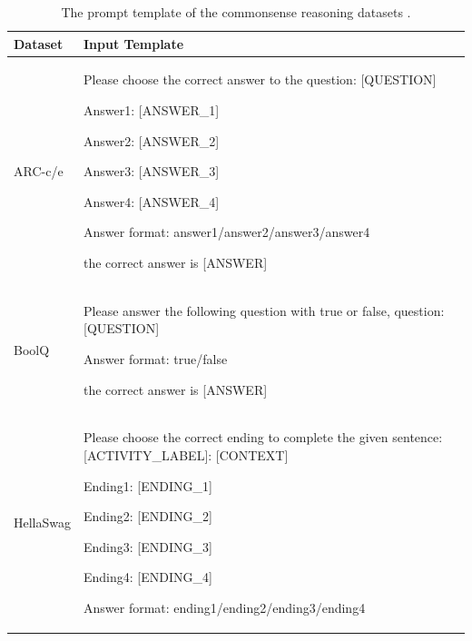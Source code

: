 \documentclass{article} %
\theoremstyle{plain}
\theoremstyle{definition}
\begin{document}
\begin{table}[H]
\caption{The prompt template of the commonsense reasoning datasets \citep{hu2023llm}.}
\label{tab:input_template}

\begin{tabularx}{\textwidth}{lX}
\toprule
Dataset & Input Template \\
\midrule


ARC-c/e & 
\begin{minipage}{\linewidth}
\begin{tcolorbox}[colback=gray!10,colframe=black!75!black, left=1mm, right=1mm, top=1mm, bottom=1mm]
Please choose the correct answer to the question: [QUESTION] 

Answer1: [ANSWER\_1]

Answer2: [ANSWER\_2]

Answer3: [ANSWER\_3]

Answer4: [ANSWER\_4]

Answer format: answer1/answer2/answer3/answer4

the correct answer is [ANSWER]
\end{tcolorbox}
\end{minipage} \\
\midrule


BoolQ & 
\begin{minipage}{\linewidth}
\begin{tcolorbox}[colback=gray!10,colframe=black!75!black, left=1mm, right=1mm, top=1mm, bottom=1mm]
Please answer the following question with true or false, question: [QUESTION]

Answer format: true/false

the correct answer is [ANSWER]
\end{tcolorbox}
\end{minipage} \\
\midrule


HellaSwag & 
\begin{minipage}{\linewidth}
\begin{tcolorbox}[colback=gray!10,colframe=black!75!black, left=1mm, right=1mm, top=1mm, bottom=1mm]
Please choose the correct ending to complete the given sentence: [ACTIVITY\_LABEL]: [CONTEXT]

Ending1: [ENDING\_1] 

Ending2: [ENDING\_2] 

Ending3: [ENDING\_3] 

Ending4: [ENDING\_4] 

Answer format: ending1/ending2/ending3/ending4 


\end{tcolorbox}
\end{minipage}
\end{tabularx}
\end{table}
\end{document}
